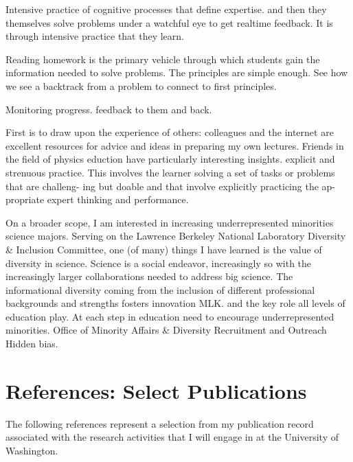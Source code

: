 \documentclass{article}
\begin{document}
Intensive practice of cognitive processes that define expertise.
 and then they themselves solve problems
under a watchful eye to get realtime feedback. 
It is through intensive practice that they learn.

Reading homework is the primary vehicle through which students gain the information
needed to solve problems.
The principles are simple enough.  See how we see a backtrack from a problem to connect
to first principles.



Monitoring progress.
feedback to them and back.


First is to draw upon the experience of others:
colleagues and the internet are excellent resources for advice and ideas in preparing
my own lectures.  Friends in the field of physics eduction have particularly interesting
insights.  
explicit and strenuous practice.
This involves the learner solving a set of tasks or problems that are challeng- ing but doable and that involve explicitly practicing the ap- propriate expert thinking and performance. 


On a broader scope, I am interested in increasing underrepresented minorities science majors.
Serving on the Lawrence Berkeley National Laboratory Diversity \& Inclusion Committee, one (of many) things I have
learned is the value of diversity in science.  Science is a social endeavor, increasingly so with
the increasingly larger collaborations needed to address big science.  The informational diversity
coming  from the inclusion of different professional backgrounds and strengths fosters innovation
MLK.
 and the key role all levels of education play.  At each step
in education need to encourage underrepresented minorities.
Office of Minority Affairs \& Diversity Recruitment and Outreach
Hidden bias.



\section{References: Select Publications}
The following references represent a selection from my publication record associated with the research
activities that I will engage in at the University of Washington.



\end{document}

